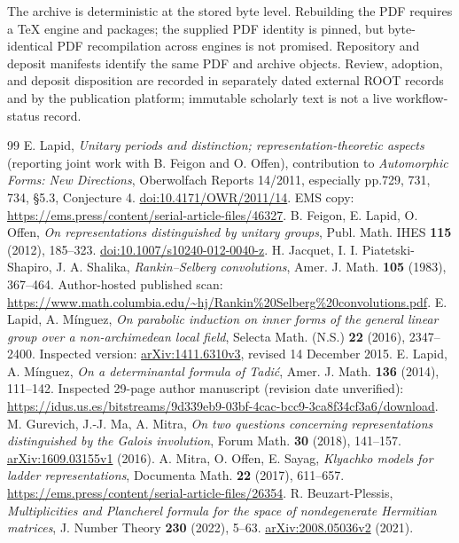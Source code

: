\documentclass[11pt]{article}
\begin{document}
The archive is deterministic at the stored byte level. Rebuilding the PDF requires a TeX engine and packages; the supplied PDF identity is pinned, but byte-identical PDF recompilation across engines is not promised. Repository and deposit manifests identify the same PDF and archive objects. Review, adoption, and deposit disposition are recorded in separately dated external ROOT records and by the publication platform; immutable scholarly text is not a live workflow-status record.

\begin{thebibliography}{99}\small
{} E. Lapid, \emph{Unitary periods and distinction; representation-theoretic aspects} (reporting joint work with B. Feigon and O. Offen), contribution to \emph{Automorphic Forms: New Directions}, Oberwolfach Reports 14/2011, especially pp.729, 731, 734, \S5.3, Conjecture 4. \href{https://doi.org/10.4171/OWR/2011/14}{doi:10.4171/OWR/2011/14}. EMS copy: \url{https://ems.press/content/serial-article-files/46327}.
 B. Feigon, E. Lapid, O. Offen, \emph{On representations distinguished by unitary groups}, Publ. Math. IHES \textbf{115} (2012), 185--323. \href{https://doi.org/10.1007/s10240-012-0040-z}{doi:10.1007/s10240-012-0040-z}.
 H. Jacquet, I. I. Piatetski-Shapiro, J. A. Shalika, \emph{Rankin--Selberg convolutions}, Amer. J. Math. \textbf{105} (1983), 367--464. Author-hosted published scan: \url{https://www.math.columbia.edu/~hj/Rankin\%20Selberg\%20convolutions.pdf}.
 E. Lapid, A. M\'inguez, \emph{On parabolic induction on inner forms of the general linear group over a non-archimedean local field}, Selecta Math. (N.S.) \textbf{22} (2016), 2347--2400. Inspected version: \href{https://arxiv.org/abs/1411.6310v3}{arXiv:1411.6310v3}, revised 14 December 2015.
 E. Lapid, A. M\'inguez, \emph{On a determinantal formula of Tadi\'c}, Amer. J. Math. \textbf{136} (2014), 111--142. Inspected 29-page author manuscript (revision date unverified): \url{https://idus.us.es/bitstreams/9d339eb9-03bf-4cac-bcc9-3ca8f34cf3a6/download}.
 M. Gurevich, J.-J. Ma, A. Mitra, \emph{On two questions concerning representations distinguished by the Galois involution}, Forum Math. \textbf{30} (2018), 141--157. \href{https://arxiv.org/abs/1609.03155v1}{arXiv:1609.03155v1} (2016).
 A. Mitra, O. Offen, E. Sayag, \emph{Klyachko models for ladder representations}, Documenta Math. \textbf{22} (2017), 611--657. \url{https://ems.press/content/serial-article-files/26354}.
 R. Beuzart-Plessis, \emph{Multiplicities and Plancherel formula for the space of nondegenerate Hermitian matrices}, J. Number Theory \textbf{230} (2022), 5--63. \href{https://arxiv.org/abs/2008.05036v2}{arXiv:2008.05036v2} (2021).

\end{thebibliography}
\end{document}

